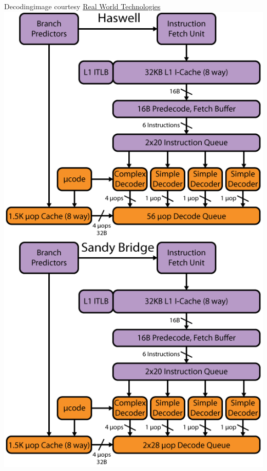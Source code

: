 \documentclass[mathserif,xcolor={dvipsnames,table}]{beamer}
\begin{document}
\begin{frame}{Decoding\hfill\tiny{image courtesy \href{http://realworldtech.com}{Real World Technologies}}}
\includegraphics[scale=.49]{images/haswell-1.png}
\end{frame}
\end{document}
